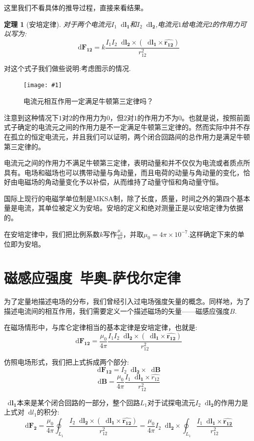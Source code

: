 \documentclass[12pt,a4paper,oneside]{report}
\newtheorem{theorem}{定理}[chapter]
\theoremstyle{definition}
\theoremstyle{remark}
\newcommand{\insertfig}[3]{
    \begin{figure}[ht]
        \centering
        \texttt{[image: \#1]}
        \caption{#2}
        \label{fig:#1}
    \end{figure}
}
\renewcommand{\d}{\mathop{}\!\mathrm{d}}
\begin{document}
这里我们不看具体的推导过程，直接来看结果。

\begin{theorem}[安培定律]

对于两个电流元$I_1\d \mathbf{l_1}$和$I_2\d \mathbf{l_2}$,电流元$1$给电流元$2$的作用力可以写为:
\[
\d \mathbf{F_{12}} = k\frac{I_1I_2\d \mathbf{l_2}\times(\d \mathbf{l_1}\times {\mathbf{\hat{r_{12}}}})}{r^2_{12}}
\]
\end{theorem}

对这个式子我们做些说明:考虑图示的情况.
  \insertfig{2-1.png}{电流元相互作用一定满足牛顿第三定律吗？}{0.25}

注意到这种情况下$1$对$2$的作用力为0，但$2$对$1$的作用力不为0。也就是说，按照前面式子确定的电流元之间的作用力是不一定满足牛顿第三定律的。然而实际中并不存在孤立的恒定电流元，并且我们可以证明，两个闭合回路间的总作用力是满足牛顿第三定律的。

电流元之间的作用力不满足牛顿第三定律，表明动量和并不仅仅为电流或者质点所具有。电场和磁场也可以携带动量与角动量，而且电荷的动量与角动量的变化，恰好由电磁场的角动量变化予以补偿，从而维持了动量守恒和角动量守恒。

国际上现行的电磁学单位制是MKSA制，除了长度，质量，时间之外的第四个基本量是电流，其单位被定义为安培。安培的定义和绝对测量正是以安培定律为依据的。

在安培定律中，我们把比例系数$k$写作$\frac{\mu_0}{4\pi}$，并取$\mu_0=4\pi\times10^{-7}$.这样确定下来的单位即为安培。


\section{\texorpdfstring{磁感应强度\, 毕奥-萨伐尔定律}{磁感应强度 毕奥-萨伐尔定律}}
为了定量地描述电场的分布，我们曾经引入过电场强度矢量的概念。同样地，为了描述电流间的相互作用，我们需要定义一个描述磁场的矢量——磁感应强度$B$.

在磁场情形中，与库仑定律相当的基本定律是安培定律，也就是:
\[
\d \mathbf{F_{12}} = \frac{\mu_0}{4\pi} \frac{I_1I_2\d \mathbf{l_2}\times(\d \mathbf{l_1}\times {\mathbf{\hat{r_{12}}}})}{r^2_{12}}
\]

仿照电场形式，我们把上式拆成两个部分:
\[
\d \mathbf{F_{12}}=I_2\mathbf{\d l_2}\times \d \mathbf{B}
\]
\[
\d \mathbf{B} = \frac{\mu_0}{4\pi}\frac{I_1 \d \mathbf{l_1}\times \hat{r_{12}}}{r^2_{12}}
\]

$\d \mathbf{l_1}$本来是某个闭合回路的一部分，整个回路$L_1$对于试探电流元$I_2 \d \mathbf{l_2}$的作用力是上式对$\d l_1$的积分:
\[
\d \mathbf{F_2} = \frac{\mu_0}{4\pi}\oint_{L_1}\frac{I_2\d \mathbf{l_2}\times(\d \mathbf{l_1}\times {\mathbf{\hat{r_{12}}}})}{r^2_{12}}=\frac{\mu_0}{4\pi}I_2\d \mathbf{l_2}\times\oint_{L_1}\frac{I_1\d \mathbf{l_1}\times {\mathbf{\hat{r_{12}}}}}{r^2_{12}}
\]
\end{document}
